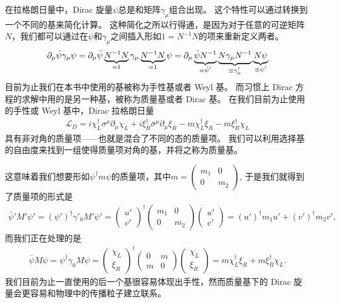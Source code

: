 在拉格朗日量中，Dirac 旋量$\psi$总是和矩阵$\gamma_\mu$组合出现。
这个特性可以通过转换到一个不同的基来简化计算。
这种简化之所以行得通，是因为对于任意的可逆矩阵$N$，我们都可以通过在$\psi$和$\gamma_\mu$之间插入形如$1=N^{-1}N$的项来重新定义两者。
\begin{align}
  \partial_\mu\bar{\psi}\gamma_\mu\psi = \partial_\mu\bar{\psi}\underbrace{N^{-1}N}_{\mathclap{=1}}\gamma_\mu\underbrace{N^{-1}N}_{\mathclap{=1}}\psi = \partial_\mu\underbrace{\bar{\psi}N^{-1}}_{\mathclap{\equiv\bar{\psi}'}}\underbrace{N\gamma_\mu N^{-1}}_{\mathclap{\equiv\gamma'_\mu}}\underbrace{N\psi}_{\mathclap{\equiv\psi'}}
\end{align}
目前为止我们在本书中使用的基被称为手性基或者 Weyl 基。
而习惯上 Dirac 方程的求解中用的是另一种基，被称为质量基或者 Dirac 基。
在我们目前为止使用的手性或 Weyl 基中，Dirac 拉格朗日量
\begin{align}
  \mathcal{L}_D=i\chi_L^\dagger\sigma^\mu\partial_\mu \chi_L+i\xi_R^\dagger\bar{\sigma}^\mu\partial_\mu \xi_R-m\chi_L^\dagger\xi_R-m\xi_R^\dagger\chi_L
\end{align}
具有非对角的质量项——也就是混合了不同的态的质量项。
我们可以利用选择基的自由度来找到一组使得质量项对角的基，并将之称为质量基。

这意味着我们想要形如$\psi^\dagger m\psi$的质量项，其中$m=\begin{pmatrix}m_1&0\\0&m_2\end{pmatrix}$,
于是我们就得到了质量项的形式是
\begin{align}
  \bar{\psi}'M'\psi'=(\psi')^\dagger%
  \gamma'_0M'\psi'=\begin{pmatrix}u'\\v'\end{pmatrix}^\dagger\begin{pmatrix}m_1&0\\0&m_2\end{pmatrix}
  \begin{pmatrix}u'\\v'\end{pmatrix}=(u')^\dagger m_1u'+(v')^\dagger m_2v',
\end{align}
而我们正在处理的是
\begin{align}
  \bar{\psi}M\psi=\psi^\dagger\gamma_0M\psi=\begin{pmatrix}\chi_L\\\xi_R\end{pmatrix}^\dagger\begin{pmatrix}0&m\\m&0\end{pmatrix}
  \begin{pmatrix}\chi_L\\\xi_R\end{pmatrix}=m\chi_L^\dagger\xi_R+m\xi_R^\dagger\chi_L.
\end{align}
我们目前为止一直使用的后一个基很容易体现出手性，然而质量基下的 Dirac 旋量会更容易和物理中的传播粒子建立联系。

